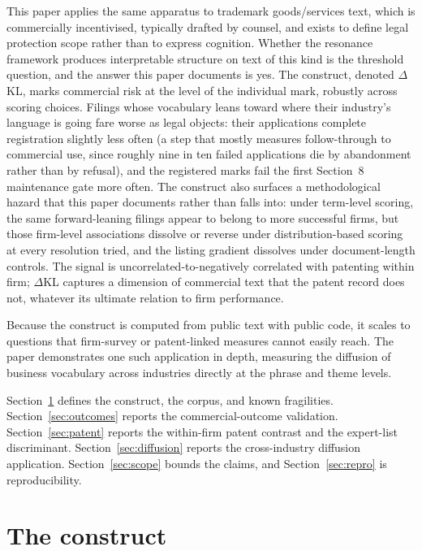 \documentclass[11pt]{article}
\newcommand{\dkl}{$\Delta$KL}
\begin{document}
This paper applies the same apparatus to trademark goods/services text,
which is commercially incentivised, typically drafted by counsel, and
exists to define legal protection scope rather than to express cognition.
Whether the resonance framework produces interpretable structure on text of
this kind is the threshold question, and the answer this paper documents is
yes. The construct, denoted \dkl{}, marks commercial risk at the level of
the individual mark, robustly across scoring choices. Filings whose
vocabulary leans toward where their industry's language is going fare
worse as legal objects: their applications complete registration slightly
less often (a step that mostly measures follow-through to commercial use,
since roughly nine in ten failed applications die by abandonment rather
than by refusal), and the registered marks fail the first Section~8
maintenance gate more often. The construct also surfaces a methodological
hazard that this paper documents rather than falls into: under term-level
scoring, the same forward-leaning filings appear to belong to more
successful firms, but those firm-level associations dissolve or reverse
under distribution-based scoring at every resolution tried, and the
listing gradient dissolves under document-length controls. The signal is
uncorrelated-to-negatively correlated with patenting within firm; \dkl{}
captures a dimension of commercial text that the patent record does not,
whatever its ultimate relation to firm performance.

Because the construct is computed from public text with public code, it
scales to questions that firm-survey or patent-linked measures cannot
easily reach. The paper demonstrates one such application in depth,
measuring the diffusion of business vocabulary across industries directly
at the phrase and theme levels.

Section~\ref{sec:construct} defines the construct, the corpus, and known
fragilities. Section~\ref{sec:outcomes} reports the commercial-outcome
validation. Section~\ref{sec:patent} reports the within-firm patent
contrast and the expert-list discriminant. Section~\ref{sec:diffusion}
reports the cross-industry diffusion application.
Section~\ref{sec:scope} bounds the claims, and
Section~\ref{sec:repro} is reproducibility.

\section{The construct}\label{sec:construct}
\end{document}
